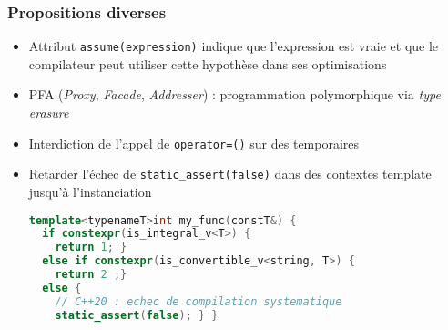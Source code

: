 \documentclass[C++.tex]{subfiles}
\begin{document}
\begin{frame}[fragile]
	\frametitle{Propositions diverses}
	\begin{itemize}
		\item Attribut \lstinline|assume(expression)| indique que l'expression est vraie et que le compilateur peut utiliser cette hypothèse dans ses optimisations
		\item PFA (\textit{Proxy}, \textit{Facade}, \textit{Addresser}) : programmation polymorphique via \textit{type erasure}


		\item Interdiction de l'appel de \lstinline|operator=()| sur des temporaires


		\item Retarder l'échec de \lstinline|static_assert(false)| dans des contextes template jusqu'à l'instanciation

		\begin{lstlisting}[language=C++]
template<typenameT>int my_func(constT&) {
  if constexpr(is_integral_v<T>) { 
    return 1; } 
  else if constexpr(is_convertible_v<string, T>) { 
    return 2 ;}
  else {
    // C++20 : echec de compilation systematique
    static_assert(false); } }\end{lstlisting}

	\end{itemize}
\end{frame}
\end{document}
